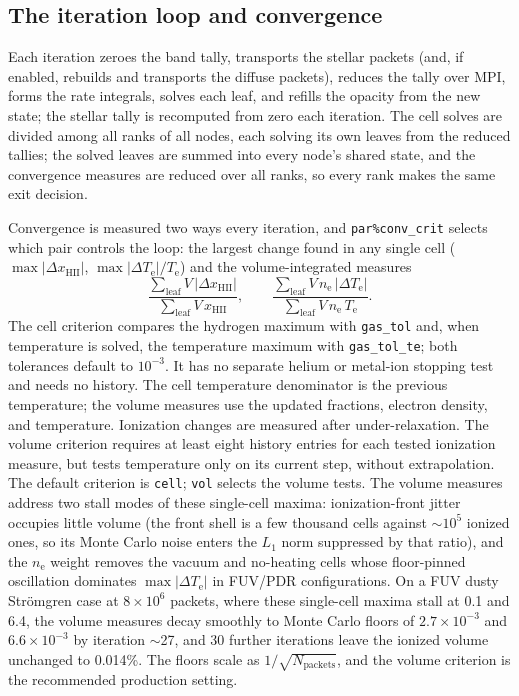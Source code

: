\documentclass[twocolumn,linenumbers]{aastex702}
\newcommand{\code}[1]{\texttt{#1}}
\newcommand{\Te}{T_{\mathrm{e}}}
\newcommand{\nelec}{n_{\mathrm{e}}}
\begin{document}
\subsection{The iteration loop and convergence}
\label{sec:iterate}

Each iteration zeroes the band tally, transports the stellar packets
(and, if enabled, rebuilds and transports the diffuse packets), reduces
the tally over MPI, forms the rate integrals, solves each leaf, and
refills the opacity from the new state; the stellar tally is recomputed
from zero each iteration.  The cell solves are divided among all ranks of
all nodes, each solving its own leaves from the reduced tallies; the solved
leaves are summed into every node's shared state, and the convergence
measures are reduced over all ranks, so every rank makes the same exit
decision.

Convergence is measured two ways every iteration, and
\code{par\%conv\_crit} selects which pair controls the loop: the largest
change found in any single cell ($\max|\Delta x_{\mathrm{HII}}|$,
$\max|\Delta \Te|/\Te$) and the volume-integrated measures
\begin{equation}
  \frac{\sum_{\mathrm{leaf}} V\,|\Delta x_{\mathrm{HII}}|}
       {\sum_{\mathrm{leaf}} V\,x_{\mathrm{HII}}},
  \qquad
  \frac{\sum_{\mathrm{leaf}} V\,\nelec\,|\Delta \Te|}
       {\sum_{\mathrm{leaf}} V\,\nelec\,\Te}.
\end{equation}
The cell criterion compares the hydrogen maximum with
\code{gas\_tol} and, when temperature is solved, the temperature maximum
with \code{gas\_tol\_te}; both tolerances default to $10^{-3}$.
It has no separate helium or metal-ion stopping test and needs no history.
The cell temperature denominator is the previous temperature; the volume
measures use the updated fractions, electron density, and temperature.
Ionization changes are measured after under-relaxation. The volume
criterion requires at least eight history entries for each tested ionization
measure, but tests temperature only on its current step, without extrapolation.
The default criterion is \code{cell}; \code{vol} selects the volume tests.
The volume measures address two stall modes of these single-cell maxima:
ionization-front jitter occupies little volume (the front shell is a few
thousand cells against $\sim$$10^5$ ionized ones, so its Monte Carlo
noise enters the $L_1$ norm suppressed by that ratio), and the $\nelec$
weight removes the vacuum and no-heating cells whose floor-pinned
oscillation dominates $\max|\Delta \Te|$ in FUV/PDR configurations.  On a
FUV dusty Str\"omgren case at $8\times10^6$ packets, where these single-cell
maxima stall at 0.1 and 6.4, the volume measures decay smoothly
to Monte Carlo floors of $2.7\times10^{-3}$ and $6.6\times10^{-3}$ by
iteration $\sim$27, and 30 further iterations leave the ionized volume
unchanged to 0.014\%.  The floors scale as $1/\sqrt{N_{\mathrm{packets}}}$,
and the volume criterion is the recommended production setting.
\end{document}

